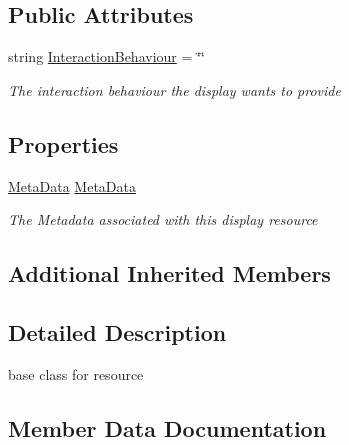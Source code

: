 \subsection*{Public Attributes}
\begin{DoxyCompactItemize}
\item 
string \mbox{\hyperlink{class_base_display_resource_a076a3844786354934f897ff2e9b24a18}{Interaction\+Behaviour}} = \char`\"{}\char`\"{}
\begin{DoxyCompactList}\small\item\em The interaction behaviour the display wants to provide \end{DoxyCompactList}\end{DoxyCompactItemize}
\subsection*{Properties}
\begin{DoxyCompactItemize}
\item 
\mbox{\hyperlink{class_meta_data}{Meta\+Data}} \mbox{\hyperlink{class_base_display_resource_a0a9f0a877d169dd6c5c07c66ae563618}{Meta\+Data}}
\begin{DoxyCompactList}\small\item\em The Metadata associated with this display resource \end{DoxyCompactList}\end{DoxyCompactItemize}
\subsection*{Additional Inherited Members}


\subsection{Detailed Description}
base class for resource 



\subsection{Member Data Documentation}
\mbox{\label{class_base_display_resource_a076a3844786354934f897ff2e9b24a18}} 
